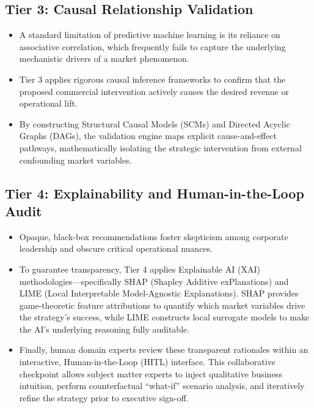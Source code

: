\documentclass[11pt, a4paper]{article}
\begin{document}
\subsection{Tier 3: Causal Relationship Validation}
\begin{itemize}[leftmargin=*]
    \item A standard limitation of predictive machine learning is its reliance on associative correlation, which frequently fails to capture the underlying mechanistic drivers of a market phenomenon.
    
    \item Tier 3 applies rigorous causal inference frameworks to confirm that the proposed commercial intervention actively causes the desired revenue or operational lift.
    
    \item By constructing Structural Causal Models (SCMs) and Directed Acyclic Graphs (DAGs), the validation engine maps explicit cause-and-effect pathways, mathematically isolating the strategic intervention from external confounding market variables.
\end{itemize}

\subsection{Tier 4: Explainability and Human-in-the-Loop Audit}
\begin{itemize}[leftmargin=*]
    \item Opaque, black-box recommendations foster skepticism among corporate leadership and obscure critical operational nuances.
    
    \item To guarantee transparency, Tier 4 applies Explainable AI (XAI) methodologies---specifically SHAP (Shapley Additive exPlanations) and LIME (Local Interpretable Model-Agnostic Explanations). SHAP provides game-theoretic feature attributions to quantify which market variables drive the strategy's success, while LIME constructs local surrogate models to make the AI's underlying reasoning fully auditable.
    
    \item Finally, human domain experts review these transparent rationales within an interactive, Human-in-the-Loop (HITL) interface. This collaborative checkpoint allows subject matter experts to inject qualitative business intuition, perform counterfactual ``what-if'' scenario analysis, and iteratively refine the strategy prior to executive sign-off.
\end{itemize}
\end{document}
